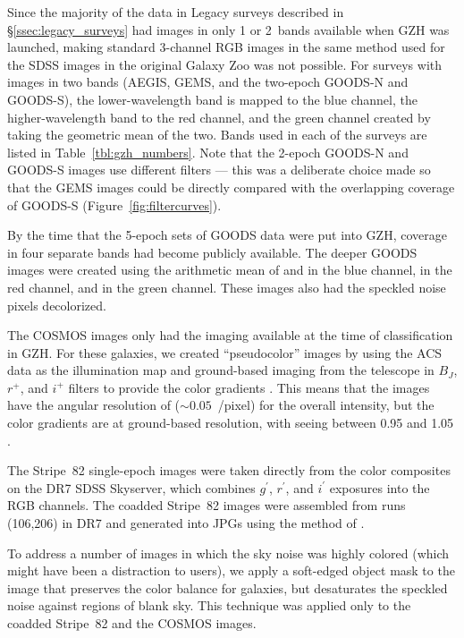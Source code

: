 \documentclass[twocolumn]{aastex6}
\begin{document}
Since the majority of the data in Legacy surveys described in \S\ref{ssec:legacy_surveys} had images in only 1 or 2~bands available when GZH was launched, making standard 3-channel RGB images in the same method used for the SDSS images in the original Galaxy Zoo was not possible. For surveys with images in two bands (AEGIS, GEMS, and the two-epoch GOODS-N and GOODS-S), the lower-wavelength band is mapped to the blue channel, the higher-wavelength band to the red channel, and the green channel created by taking the geometric mean of the two. Bands used in each of the surveys are listed in Table~\ref{tbl:gzh_numbers}. Note that the 2-epoch GOODS-N and GOODS-S images use different filters --- this was a deliberate choice made so that the GEMS images could be directly compared with the overlapping coverage of GOODS-S (Figure~\ref{fig:filtercurves}). 

By the time that the 5-epoch sets of GOODS data were put into GZH, coverage in four separate \hst{} bands had become publicly available. The deeper GOODS images were created using the arithmetic mean of \Bband{} and \Vband in the blue channel, \Iband{} in the red channel, and \zband in the green channel. These images also had the speckled noise pixels decolorized. 

The COSMOS images only had the \Iband{} imaging available at the time of classification in GZH. For these galaxies, we created ``pseudocolor'' images by using the ACS \Iband{} data as the illumination map and ground-based imaging from the \subaru{} telescope in $B_J$, $r^+$, and $i^+$ filters to provide the color gradients \citep[see][for further details]{gri12}. This means that the images have the angular resolution of \hst{} ($\sim0.05$~\arcsec/pixel) for the overall intensity, but the color gradients are at ground-based resolution, with seeing between 0\arcsec.95 and 1\arcsec.05 \citep{tan07}.

The Stripe~82 single-epoch images were taken directly from the color composites on the DR7 SDSS Skyserver, which combines $g^{\prime}$, $r^{\prime}$, and $i^{\prime}$ exposures into the RGB channels. The coadded Stripe~82 images were assembled from runs (106,206) in DR7 and generated into JPGs using the method of \citet{lup04}.

To address a number of images in which the sky noise was highly colored (which might have been a distraction to users), we apply a soft-edged object mask to the image that preserves the color balance for galaxies, but desaturates the speckled noise against regions of blank sky. This technique was applied only to the coadded Stripe~82 and the COSMOS images.
\end{document}
